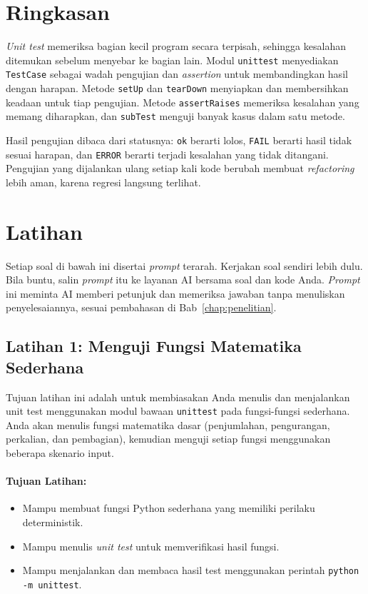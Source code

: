 \section{Ringkasan}
\textit{Unit test} memeriksa bagian kecil program secara terpisah, sehingga kesalahan ditemukan sebelum menyebar ke bagian lain. Modul \texttt{unittest} menyediakan \texttt{TestCase} sebagai wadah pengujian dan \textit{assertion} untuk membandingkan hasil dengan harapan. Metode \texttt{setUp} dan \texttt{tearDown} menyiapkan dan membersihkan keadaan untuk tiap pengujian. Metode \texttt{assertRaises} memeriksa kesalahan yang memang diharapkan, dan \texttt{subTest} menguji banyak kasus dalam satu metode.

Hasil pengujian dibaca dari statusnya: \texttt{ok} berarti lolos, \texttt{FAIL} berarti hasil tidak sesuai harapan, dan \texttt{ERROR} berarti terjadi kesalahan yang tidak ditangani. Pengujian yang dijalankan ulang setiap kali kode berubah membuat \textit{refactoring} lebih aman, karena regresi langsung terlihat.

\section*{Latihan}

Setiap soal di bawah ini disertai \textit{prompt} terarah. Kerjakan soal sendiri lebih dulu. Bila buntu, salin \textit{prompt} itu ke layanan AI bersama soal dan kode Anda. \textit{Prompt} ini meminta AI memberi petunjuk dan memeriksa jawaban tanpa menuliskan penyelesaiannya, sesuai pembahasan di Bab~\ref{chap:penelitian}.

\subsection*{Latihan 1: Menguji Fungsi Matematika Sederhana}

Tujuan latihan ini adalah untuk membiasakan Anda menulis dan menjalankan unit test menggunakan modul bawaan \texttt{unittest} pada fungsi-fungsi sederhana.  
Anda akan menulis fungsi matematika dasar (penjumlahan, pengurangan, perkalian, dan pembagian), kemudian menguji setiap fungsi menggunakan beberapa skenario input.

\paragraph{Tujuan Latihan:}
\begin{itemize}
    \item Mampu membuat fungsi Python sederhana yang memiliki perilaku deterministik.
    \item Mampu menulis \textit{unit test} untuk memverifikasi hasil fungsi.
    \item Mampu menjalankan dan membaca hasil test menggunakan perintah \texttt{python -m unittest}.
\end{itemize}

